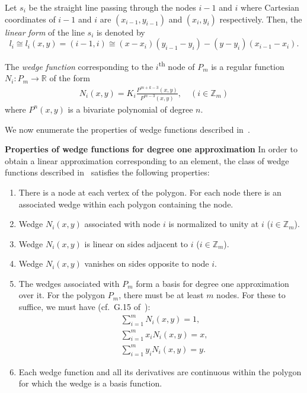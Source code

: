 \documentclass[automatic-bibliography, defaultmaths=false]{univsciauth}
\begin{document}
\begin{definition}
  Let $s_{i}$ be the straight line passing through the nodes $i-1$ and $i$
  where Cartesian coordinates of $i-1$ and $i$ are $(x_{i-1},y_{i-1})$ and
  $(x_i,y_i)$ respectively. Then, the \emph{linear form} of the line $s_i$ is
  denoted by
  \begin{equation}\label{r1}
    l_i\cong l_i(x,y)=(i-1,i)\cong (x-x_i)(y_{i-1}-y_i)-(y-y_i)(x_{i-1}-x_i).
  \end{equation}
\end{definition}

\begin{definition}
  The \emph{wedge function} corresponding to the $i$\textsuperscript{th} node of
  $P_m$ is a regular function $N_i: P_m \rightarrow \mathbb{R}$ of the form
  \begin{eqnarray}
    N_i(x,y)= K_i\frac{P^{m+k-3}(x,y)}{P^{m-3}(x,y)},\quad (i\in\mathbb{Z}_m)\label{eq1}
  \end{eqnarray}
  where $P^n(x,y)$ is a bivariate polynomial of degree $n$.
\end{definition}

We now enumerate the properties of wedge functions described in~\cite{wachs}.

\textbf{Properties of wedge functions for degree one approximation}\:\cite{wachs}
In order to obtain a linear approximation corresponding to an element, the class
of wedge functions described in~\cite{wachs} satisfies the following properties:
\begin{enumerate}
  \item There is a node at each vertex of the polygon. For each node there is an
        associated wedge within each polygon containing the node.
  \item Wedge $N_i(x,y)$ associated with node $i$ is normalized to unity at $i$
        ($i\in\mathbb{Z}_m$).
  \item Wedge $N_i(x,y)$ is linear on sides adjacent to $i$
        ($i\in\mathbb{Z}_m$).
  \item{\label{4_2}} Wedge $N_i(x,y)$ vanishes on sides opposite to node
        $i$.
  \item{\label{5_2}} The wedges associated with $P_m$ form a basis for
        degree one approximation over it. For the polygon $P_m$, there must be at least
        $m$ nodes. For these to suffice, we must have (cf.~G.15 of~\cite{das1}):
        \begin{align}
          &\sum_{i=1}^{m}N_i(x,y) = 1, \label{2.1_1}\\
          &\sum_{i=1}^{m}x_iN_i(x,y) = x,\\
          &\sum_{i=1}^{m}y_iN_i(x,y) = y.
        \end{align}
  \item Each wedge function and all its derivatives are continuous within the polygon
        for which the wedge is a basis function.
\end{enumerate}
\end{document}
